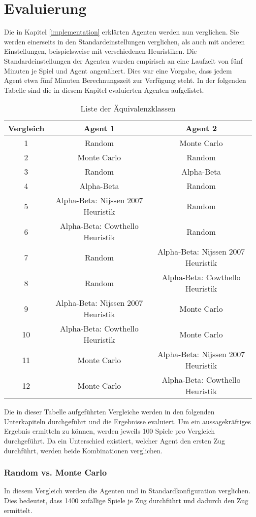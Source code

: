 \chapter{Evaluierung}
Die in Kapitel \ref{implementation} erklärten Agenten werden nun verglichen. Sie werden einerseits in den Standardeinstellungen verglichen, als auch mit anderen Einstellungen, beispielsweise mit verschiedenen Heuristiken. Die Standardeinstellungen der Agenten wurden empirisch an eine Laufzeit von fünf Minuten je Spiel und Agent angenähert. Dies war eine Vorgabe, dass jedem Agent etwa fünf Minuten Berechnungszeit zur Verfügung steht.
In der folgenden Tabelle sind die in diesem Kapitel evaluierten Agenten aufgelistet.
\begin{table}[ht]
\begin{center}
\begin{tabular}{| c | c | c |} \hline
Vergleich & Agent 1 & Agent 2 \\ \hline
1 & Random & Monte Carlo  \\ \hline
2 & Monte Carlo & Random\\ \hline
3 & Random & Alpha-Beta\\ \hline
4 & Alpha-Beta & Random\\ \hline
5 & Alpha-Beta: Nijssen 2007 Heuristik & Random\\ \hline
6 & Alpha-Beta: Cowthello Heuristik & Random\\ \hline
7 & Random & Alpha-Beta: Nijssen 2007 Heuristik \\ \hline
8 & Random & Alpha-Beta: Cowthello Heuristik \\ \hline
9 & Alpha-Beta: Nijssen 2007 Heuristik & Monte Carlo\\ \hline
10 & Alpha-Beta: Cowthello Heuristik & Monte Carlo\\ \hline
11 & Monte Carlo & Alpha-Beta: Nijssen 2007 Heuristik \\ \hline
12 & Monte Carlo & Alpha-Beta: Cowthello Heuristik \\ \hline
\end{tabular}
\end{center}
\caption{Liste der Äquivalenzklassen}
\label{agents1}
\end{table}

Die in dieser Tabelle aufgeführten Vergleiche werden in den folgenden Unterkapiteln durchgeführt und die Ergebnisse evaluiert.
Um ein aussagekräftiges Ergebnis ermitteln zu können, werden jeweils 100 Spiele pro Vergleich durchgeführt. Da ein Unterschied existiert, welcher Agent den ersten Zug durchführt, werden beide Kombinationen verglichen.
\subsection{Random vs. Monte Carlo}
In diesem Vergleich werden die Agenten  und  in Standardkonfiguration verglichen. Dies bedeutet, dass  1400 zufällige Spiele je Zug durchführt und dadurch den  Zug ermittelt.